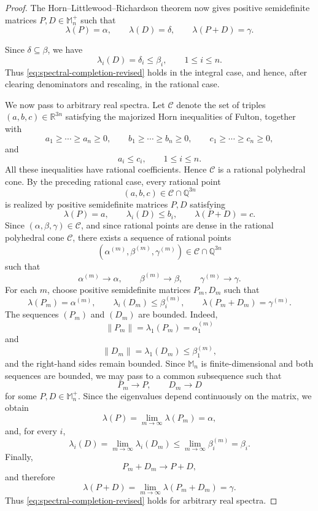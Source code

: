 \documentclass[10pt,a4paper]{amsart}
\numberwithin{equation}{section}
\newcommand{\Mn}{\mathbb M_n}
\newcommand{\Mnp}{\mathbb M_n^+}
\begin{document}
\begin{proof}
The Horn--Littlewood--Richardson theorem now gives positive
semidefinite matrices \(P,D\in\Mnp\) such that
\[
    \lambda(P)=\alpha,\qquad
    \lambda(D)=\delta,\qquad
    \lambda(P+D)=\gamma.
\]

Since \(\delta\subseteq\beta\), we have
\[
    \lambda_i(D)=\delta_i\leq\beta_i,
    \qquad 1\leq i\leq n.
\]
Thus \eqref{eq:spectral-completion-revised} holds in the integral case,
and hence, after clearing denominators and rescaling, in the rational
case.

We now pass to arbitrary real spectra. Let \(\mathcal C\) denote the
set of triples \((a,b,c)\in\mathbb{R}^{3n}\) satisfying the majorized
Horn inequalities of Fulton, together with
\[
    a_1\geq\cdots\geq a_n\geq0,\qquad
    b_1\geq\cdots\geq b_n\geq0,\qquad
    c_1\geq\cdots\geq c_n\geq0,
\]
and
\[
    a_i\leq c_i,
    \qquad 1\leq i\leq n.
\]
All these inequalities have rational coefficients. Hence
\(\mathcal C\) is a rational polyhedral cone. 
By the preceding rational case, every rational point
\[
    (a,b,c)\in\mathcal C\cap\mathbb{Q}^{3n}
\]
is realized by positive semidefinite matrices \(P,D\) satisfying
\[
    \lambda(P)=a,\qquad
    \lambda_i(D)\leq b_i,\qquad
    \lambda(P+D)=c.
\]
Since \((\alpha,\beta,\gamma)\in\mathcal C\), and since rational
points are dense in the rational polyhedral cone \(\mathcal C\), there
exists a sequence of rational points
\[
    (\alpha^{(m)},\beta^{(m)},\gamma^{(m)})
    \in\mathcal C\cap\mathbb{Q}^{3n}
\]
such that
\[
    \alpha^{(m)}\longrightarrow\alpha,\qquad
    \beta^{(m)}\longrightarrow\beta,\qquad
    \gamma^{(m)}\longrightarrow\gamma.
\]
For each \(m\), choose positive semidefinite matrices
\(P_m,D_m\) such that
\[
    \lambda(P_m)=\alpha^{(m)},\qquad
    \lambda_i(D_m)\leq\beta_i^{(m)},\qquad
    \lambda(P_m+D_m)=\gamma^{(m)}.
\]
The sequences \((P_m)\) and \((D_m)\) are bounded. Indeed,
\[
    \|P_m\|
    =\lambda_1(P_m)
    =\alpha_1^{(m)}
\]
and
\[
    \|D_m\|
    =\lambda_1(D_m)
    \leq\beta_1^{(m)},
\]
and the right-hand sides remain bounded.
Since $\Mn$ is finite-dimensional and both sequences are bounded,
we may pass to a common subsequence such that
\[
    P_m\longrightarrow P,\qquad
    D_m\longrightarrow D
\]
for some \(P,D\in\Mnp\). 
Since the  eigenvalues depend continuously on the matrix, we
obtain
\[
    \lambda(P)
    =\lim_{m\to\infty}\lambda(P_m)
    =\alpha,
\]
and, for every \(i\),
\begin{equation}\label{eq:eigenvalue-continuity}
    \lambda_i(D)
    =\lim_{m\to\infty}\lambda_i(D_m)
    \leq
    \lim_{m\to\infty}\beta_i^{(m)}
    =\beta_i.
\end{equation}
Finally,
\[
    P_m+D_m\longrightarrow P+D,
\]
and therefore
\[
    \lambda(P+D)
    =
    \lim_{m\to\infty}\lambda(P_m+D_m)
    =
    \gamma.
\]
Thus \eqref{eq:spectral-completion-revised} holds for arbitrary real
spectra.


\end{proof}
\end{document}
